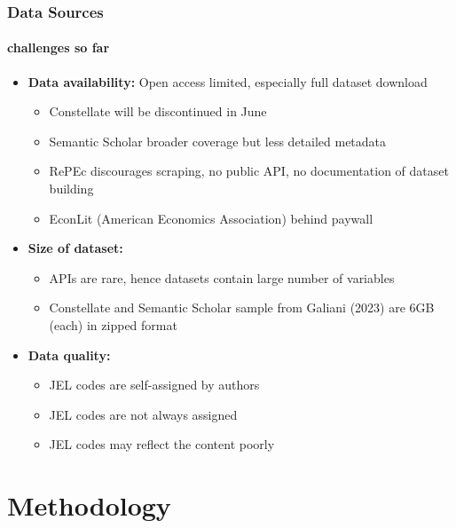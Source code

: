 \documentclass[aspectratio=1610]{beamer}
\begin{document}
\begin{frame}
	\frametitle{Data Sources}
		\framesubtitle{challenges so far}

		\begin{itemize}
			\item \textbf{Data availability:} Open access limited, especially full dataset download
			\begin{itemize}
				\item Constellate will be discontinued in June
				\item Semantic Scholar broader coverage but less detailed metadata
				\item RePEc discourages scraping, no public API, no documentation of dataset building
				\item EconLit (American Economics Association) behind paywall
			\end{itemize}
			\item \textbf{Size of dataset:}
			\begin{itemize}
				\item APIs are rare, hence datasets contain large number of variables
				\item Constellate and Semantic Scholar sample from Galiani (2023) are 6GB (each) in zipped format
			\end{itemize}
			\item \textbf{Data quality:}
			\begin{itemize}
				\item JEL codes are self-assigned by authors
				\item JEL codes are not always assigned
				\item JEL codes may reflect the content poorly
			\end{itemize}
		\end{itemize}
	\end{frame}

\section{Methodology}
\end{document}
